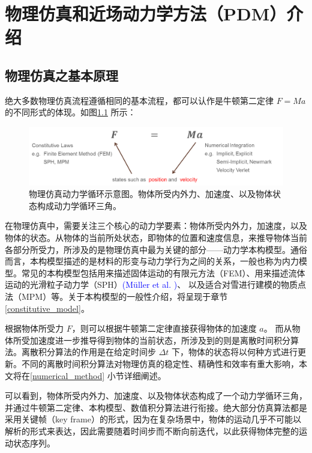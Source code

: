 ﻿\chapter{物理仿真和近场动力学方法（PDM）介绍}

\section{物理仿真之基本原理}
绝大多数物理仿真流程遵循相同的基本流程，都可以认作是牛顿第二定律 $F = Ma$ 的不同形式的体现。如图\ref{fig_physically_based_animation} 所示：
\begin{figure}[htbp!]
  \centering
  \captionsetup{justification=centering}
  \includegraphics[width=\linewidth]{chap/image/physically_based_animation}

  \caption{\label{fig_physically_based_animation}
           物理仿真动力学循环示意图。物体所受内外力、加速度、以及物体状态构成动力学循环三角。
          }
\end{figure}

在物理仿真中，需要关注三个核心的动力学要素：物体所受内外力，加速度，以及物体的状态。从物体的当前所处状态，即物体的位置和速度信息，来推导物体当前各部分所受力，所涉及的是物理仿真中最为关键的部分——动力学本构模型。通俗而言，本构模型描述的是材料的形变与动力学行为之间的关系，一般也称为内力模型。常见的本构模型包括用来描述固体运动的有限元方法（FEM）、用来描述流体运动的光滑粒子动力学（SPH）\textcolor{blue}{(M\"{u}ller et al. )\parencite{Muller2003}}、 以及适合对雪进行建模的物质点法（MPM）等。关于本构模型的一般性介绍，将呈现于章节\ref{constitutive_model}。

根据物体所受力 $F$，则可以根据牛顿第二定律直接获得物体的加速度 $a$。 而从物体所受加速度进一步推导得到物体的当前状态，所涉及到的则是离散时间积分算法。离散积分算法的作用是在给定时间步 $\Delta t$ 下，物体的状态将以何种方式进行更新。不同的离散时间积分算法对物理仿真的稳定性、精确性和效率有重大影响，本文将在\ref{numerical_method} 小节详细阐述。

可以看到，物体所受内外力、加速度、以及物体状态构成了一个动力学循环三角，并通过牛顿第二定律、本构模型、数值积分算法进行衔接。绝大部分仿真算法都是采用关键帧（key frame）的形式，因为在复杂场景中，物体的运动几乎不可能以解析的形式来表达，因此需要随着时间步而不断向前迭代，以此获得物体完整的运动状态序列。


